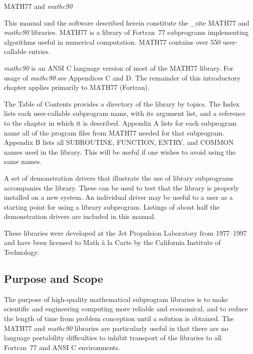 \documentclass[twoside]{MATH77}
\begin{document}

 MATH77 and {\em mathc90}



This manual and the software described herein constitute
the \base_site MATH77 and {\em mathc90} libraries. MATH77 is a library of
Fortran~77 subprograms implementing algorithms useful in numerical
computation. MATH77 contains over 550 user-callable entries.

{\em mathc90} is an ANSI C language version of most of the MATH77 library.
For usage of {\em mathc90} see Appendices C and D. The remainder of this
introductory chapter applies primarily to MATH77 (Fortran).

The Table of Contents provides a directory of the library by topics. The
Index lists each user-callable subprogram name, with its argument
list, and a reference to the chapter in which it is described. Appendix A
lists for each subprogram name all of the program files from MATH77 needed
for that subprogram. Appendix B lists all SUBROUTINE, FUNCTION, ENTRY, and
COMMON names used in the library. This will be useful if one wishes to avoid
using the same names.

A set of demonstration drivers that illustrate the use of library
subprograms accompanies the library.  These can be used to test that the
library is properly installed on a new system.  An individual driver may
be useful to a user as a starting point for using a library subprogram.
Listings of about half the demonstration drivers are included in this
manual.

These libraries were developed at the Jet Propulsion Laboratory 
from 1977--1997 and have been licensed to Math \`a la Carte by the
California Institute of Technology.

\subsection{Purpose and Scope}

The purpose of high-quality mathematical subprogram libraries is to make
scientific and engineering computing more reliable and economical, and to
reduce the length of time from problem conception until a solution is
obtained.  The MATH77 and {\em mathc90} libraries are particularly useful
in that there are no language portability difficulties to inhibit
transport of the libraries to all Fortran~77 and ANSI C environments.
\end{document}
